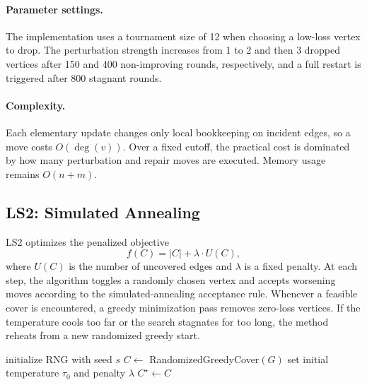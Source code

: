 \documentclass[sigconf,nonacm]{acmart}
\begin{document}
\paragraph{Parameter settings.}
The implementation uses a tournament size of 12 when choosing a low-loss vertex to drop. The perturbation strength increases from 1 to 2 and then 3 dropped vertices after 150 and 400 non-improving rounds, respectively, and a full restart is triggered after 800 stagnant rounds.

\paragraph{Complexity.}
Each elementary update changes only local bookkeeping on incident edges, so a move costs $O(\deg(v))$. Over a fixed cutoff, the practical cost is dominated by how many perturbation and repair moves are executed. Memory usage remains $O(n+m)$.

\subsection{LS2: Simulated Annealing}
LS2 optimizes the penalized objective
\[
f(C)=|C|+\lambda \cdot U(C),
\]
where $U(C)$ is the number of uncovered edges and $\lambda$ is a fixed penalty. At each step, the algorithm toggles a randomly chosen vertex and accepts worsening moves according to the simulated-annealing acceptance rule. Whenever a feasible cover is encountered, a greedy minimization pass removes zero-loss vertices. If the temperature cools too far or the search stagnates for too long, the method reheats from a new randomized greedy start.

\begin{algorithm}[t]
\caption{LS2: Simulated Annealing for MVC}
initialize RNG with seed $s$\;
$C \leftarrow$ RandomizedGreedyCover$(G)$\;
set initial temperature $\tau_0$ and penalty $\lambda$\;
$C^\star \leftarrow C$\;
\end{algorithm}
\end{document}
